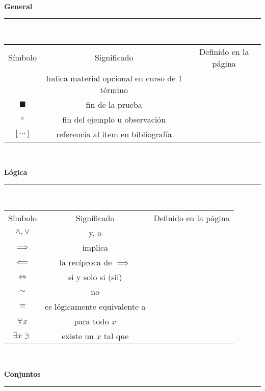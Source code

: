 \documentclass[a4,paper]{article}
\newcommand{\centrado}[1]{
	\ \\[.1\baselineskip]
	{\Large\bfseries\centering #1\par}
	\hrule
	\ \\[.1\baselineskip]
}
\begin{document}
\centrado{General}
	\begin{tabular}{ccc}
		Símbolo & Significado & Definido en la página \\
		\textasteriskcentered &  Indica material opcional en curso de 1 término &\\
		$\blacksquare$	& fin de la prueba &\\
		$\square$		& fin del ejemplo u observación &\\
		$\left[\cdots\right]$ & referencia al ítem en bibliografía &\\
	\end{tabular}
\centrado{Lógica}
\begin{tabular}{ccc}
		Símbolo & Significado & Definido en la página \\
		$\wedge,\vee$ & y, o & \\
		$\implies$ & implica & \\
		$\impliedby$ & la recíproca de $\implies$ & \\
		$\iff$ & si y solo si (sii) & \\
		$\sim$ & no & \\
		$\equiv$ & es lógicamente equivalente a & \\
		$\forall x$ & para todo $x$ & \\
		$\exists x\ni$ & existe un $x$ tal que & \\
\end{tabular}
\centrado{Conjuntos}
\end{document}
